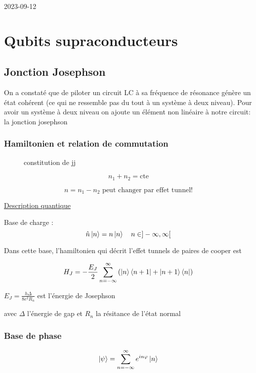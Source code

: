 


2023-09-12

\setcounter{section}{2}

\section{Qubits supraconducteurs}


\subsection{Jonction Josephson}

On a constaté que de piloter un circuit LC à sa fréquence de résonance génère un état cohérent (ce qui ne ressemble pas du tout à un système à deux niveau). Pour avoir un système à deux niveau on ajoute un élément non linéaire à notre circuit: la jonction josephson

\subsubsection{Hamiltonien et relation de commutation}

\begin{figure}[ht]
    \centering
    \caption{constitution de jj}
    \label{fig:constitution-de-jj}
\end{figure}


\[ n_1 + n_2 = \text{cte}  \]

\[ n = n_1 - n_2 \text{ peut changer par effet tunnel!}  \]


\underline{Description quantique} 


Base de charge : \[ \hat n \ket{n} = n \ket{n} \quad n \in ] -\infty, \infty [ \]


Dans cette base, l'hamiltonien qui décrit l'effet tunnels de paires de cooper est

\[ H_J = - \frac{E_J}{2} \sum_{n=-\infty}^{\infty} \left( \ket{n}\bra{n+1} + \ket{n+1}\bra{n} \right)  \]


$E_J =  \frac{h \Delta}{8 e^{2}R_n} $ est l'énergie de Josephson

avec $\Delta$ l'énergie de gap et $R_n$ la résitance de l'état normal


\subsubsection{Base de phase}


\[ \ket{\psi} = \sum_{n=-\infty}^{\infty} e^{in\varphi}\ket{n} \]

